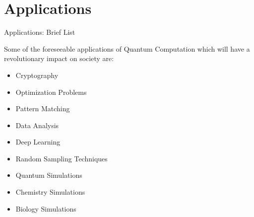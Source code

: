 \documentclass[9pt, handout, aspectratio=169]{beamer}	%
\begin{document}
\section{Applications}

	\begin{frame}{Applications: Brief List}

		Some of the foreseeable applications of Quantum Computation which will have a revolutionary impact on society are:

		\begin{multicols}{2}
			\begin{itemize}
				\item<2->{ Cryptography }
				\item<3->{ Optimization Problems }
				\item<4->{ Pattern Matching }
				\item<4->{ Data Analysis }
				\item<5->{ Deep Learning }
				\item<5->{ Random Sampling Techniques }
				\item<6->{ Quantum Simulations }
				\item<6->{ Chemistry Simulations }
				\item<6->{ Biology Simulations }
			\end{itemize}

			\columnbreak
		\end{multicols}

	\end{frame}
\end{document}
